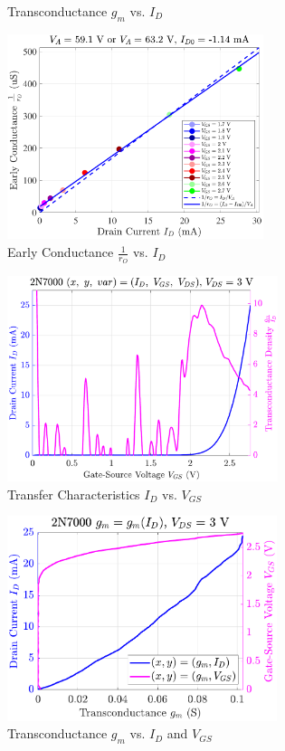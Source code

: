 \documentclass[UTF8]{article}
\begin{document}
\begin{center}
\begin{minipage}{0.45\columnwidth}
\begin{figure}[H]
        \caption{Transconductance $g_m$ vs. $I_D$}
    \end{figure}
\end{minipage}\hfill\begin{minipage}{0.45\columnwidth}
    \begin{figure}[H]\centering
        \includegraphics[height=170pt]{LCE-04-场效应管/assets/2N7000 (NMOS) [onsemi, KH32] current level mid (0~25mA)/2025-04-24_00-04-24__stc_rO_Id_Vgs.pdf}
        \caption{Early Conductance $\frac{1}{r_O}$ vs. $I_D$}
    \end{figure}
    \begin{figure}[H]\centering
        \includegraphics[height=170pt]{LCE-04-场效应管/assets/2N7000 (NMOS) [onsemi, KH32] current level mid (0~25mA)/2025-04-24_00-04-28__stc_Id_Vgs_Vds.pdf}
        \caption{Transfer Characteristics $I_D$ vs. $V_{GS}$}
    \end{figure}
    \begin{figure}[H]\centering
        \includegraphics[height=170pt]{LCE-04-场效应管/assets/2N7000 (NMOS) [onsemi, KH32] current level mid (0~25mA)/2025-04-24_00-04-31__stc_gm_IdVgs_yyplot.pdf}
        \caption{Transconductance $g_m$ vs. $I_D$ and $V_{GS}$}
    \end{figure}
\end{minipage}\end{center}
\end{document}
